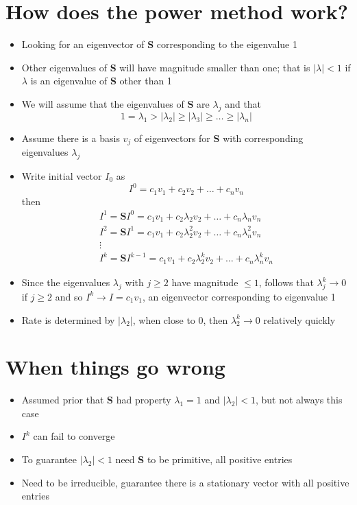 \documentclass[11pt]{report}
\begin{document}
\section{How does the power method work?}
\begin{itemize}
\item Looking for an eigenvector of \textbf{S} corresponding to the eigenvalue 1
\item Other eigenvalues of \textbf{S} will have magnitude smaller than one; that is $\vert\lambda\vert <1$ if $\lambda$ is an eigenvalue of \textbf{S} other than 1
\item We will assume that the eigenvalues of \textbf{S} are $\lambda_j$ and that \begin{equation}
1=\lambda_1>\vert\lambda_2\vert\geq\vert\lambda_3\vert\geq\ldots\geq\vert\lambda_n\vert
\end{equation}
\item Assume there is a basis $v_j$ of eigenvectors for \textbf{S} with corresponding eigenvalues $\lambda_j$ 
\item Write initial vector $I_0$ as \begin{equation}
I^0 = c_1v_1 + c_2v_2 + \ldots + c_nv_n
\end{equation}
then \begin{multline}
I^1 =\textbf{S}I^0= c_1v_1 + c_2\lambda_2v_2 + \ldots + c_n\lambda_nv_n\\
I^2 =\textbf{S}I^1= c_1v_1 + c_2\lambda_2^2v_2 + \ldots + c_n\lambda_n^2v_n\\
\vdots\\
I^k =\textbf{S}I^{k-1}= c_1v_1 + c_2\lambda_2^kv_2 + \ldots + c_n\lambda_n^kv_n
\end{multline}
\item Since the eigenvalues $\lambda_j$ with $j\geq2$ have magnitude $\leq1$, follows that $\lambda^k_j\rightarrow0$ if $j\geq2$ and so $I^k\rightarrow I=c_1v_1$, an eigenvector corresponding to eigenvalue 1
\item Rate is determined by $\vert\lambda_2\vert$, when close to 0, then $\lambda_2^k \rightarrow0$ relatively quickly
\end{itemize}
\section{When things go wrong}
\begin{itemize}
\item Assumed prior that \textbf{S} had property $\lambda_1 = 1$ and $\vert\lambda_2\vert<1$, but not always this case
\item $I^k$ can fail to converge
\item To guarantee $\vert\lambda_2\vert<1$ need \textbf{S} to be primitive, all positive entries
\item Need to be irreducible, guarantee there is a stationary vector with all positive entries
\end{itemize}
\end{document}
